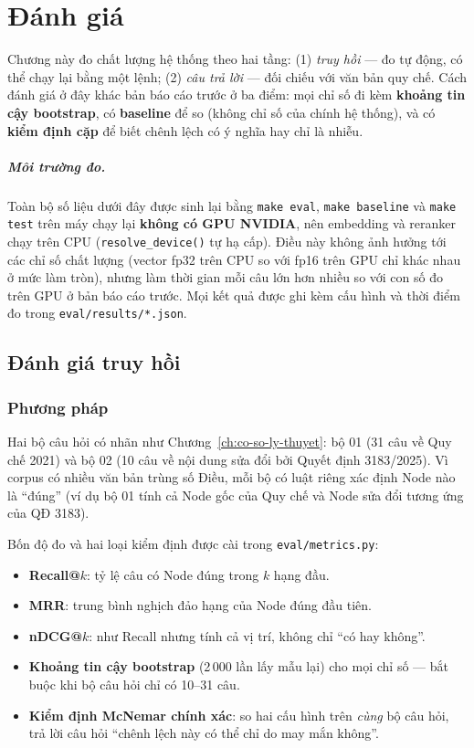 \chapter{Đánh giá}
\label{ch:danh-gia}

Chương này đo chất lượng hệ thống theo hai tầng: (1) \emph{truy hồi} --- đo tự động, có thể chạy lại
bằng một lệnh; (2) \emph{câu trả lời} --- đối chiếu với văn bản quy chế. Cách đánh giá ở đây khác bản
báo cáo trước ở ba điểm: mọi chỉ số đi kèm \textbf{khoảng tin cậy bootstrap}, có \textbf{baseline}
để so (không chỉ số của chính hệ thống), và có \textbf{kiểm định cặp} để biết chênh lệch có ý nghĩa
hay chỉ là nhiễu.

\paragraph{Môi trường đo.} Toàn bộ số liệu dưới đây được sinh lại bằng \texttt{make eval},
\texttt{make baseline} và \texttt{make test} trên máy chạy lại \textbf{không có GPU NVIDIA}, nên
embedding và reranker chạy trên CPU (\texttt{resolve\_device()} tự hạ cấp). Điều này không ảnh hưởng
tới các chỉ số chất lượng (vector fp32 trên CPU so với fp16 trên GPU chỉ khác nhau ở mức làm tròn),
nhưng làm thời gian mỗi câu lớn hơn nhiều so với con số đo trên GPU ở bản báo cáo trước. Mọi kết quả
được ghi kèm cấu hình và thời điểm đo trong \texttt{eval/results/*.json}.


\section{Đánh giá truy hồi}

\subsection{Phương pháp}

Hai bộ câu hỏi có nhãn như Chương~\ref{ch:co-so-ly-thuyet}: bộ 01 (31 câu về Quy chế 2021) và bộ 02
(10 câu về nội dung sửa đổi bởi Quyết định 3183/2025). Vì corpus có nhiều văn bản trùng số Điều, mỗi
bộ có luật riêng xác định Node nào là ``đúng'' (ví dụ bộ 01 tính cả Node gốc của Quy chế và Node sửa
đổi tương ứng của QĐ 3183).

Bốn độ đo và hai loại kiểm định được cài trong \texttt{eval/metrics.py}:

\begin{itemize}
  \item \textbf{Recall@$k$}: tỷ lệ câu có Node đúng trong $k$ hạng đầu.
  \item \textbf{MRR}: trung bình nghịch đảo hạng của Node đúng đầu tiên.
  \item \textbf{nDCG@$k$}: như Recall nhưng tính cả vị trí, không chỉ ``có hay không''.
  \item \textbf{Khoảng tin cậy bootstrap} (2\,000 lần lấy mẫu lại) cho mọi chỉ số --- bắt buộc khi bộ
        câu hỏi chỉ có 10--31 câu.
  \item \textbf{Kiểm định McNemar chính xác}: so hai cấu hình trên \emph{cùng} bộ câu hỏi, trả lời
        câu hỏi ``chênh lệch này có thể chỉ do may mắn không''.
\end{itemize}

